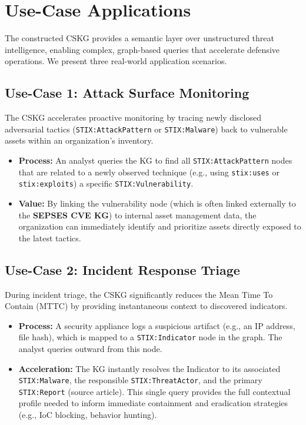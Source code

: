\section{Use-Case Applications}

The constructed CSKG provides a semantic layer over unstructured threat intelligence, enabling complex, graph-based queries that accelerate defensive operations. We present three real-world application scenarios.

\subsection{Use-Case 1: Attack Surface Monitoring}
The CSKG accelerates proactive monitoring by tracing newly disclosed adversarial tactics (\texttt{STIX:AttackPattern} or \texttt{STIX:Malware}) back to vulnerable assets within an organization's inventory.

\begin{itemize}
    \item \textbf{Process:} An analyst queries the KG to find all \texttt{STIX:AttackPattern} nodes that are related to a newly observed technique (e.g., using \texttt{stix:uses} or \texttt{stix:exploits}) a specific \texttt{STIX:Vulnerability}.
    \item \textbf{Value:} By linking the vulnerability node (which is often linked externally to the \textbf{SEPSES CVE KG}) to internal asset management data, the organization can immediately identify and prioritize assets directly exposed to the latest tactics.
\end{itemize}

\subsection{Use-Case 2: Incident Response Triage}
During incident triage, the CSKG significantly reduces the Mean Time To Contain (MTTC) by providing instantaneous context to discovered indicators.

\begin{itemize}
    \item \textbf{Process:} A security appliance logs a suspicious artifact (e.g., an IP address, file hash), which is mapped to a \texttt{STIX:Indicator} node in the graph. The analyst queries outward from this node.
    \item \textbf{Acceleration:} The KG instantly resolves the Indicator to its associated \texttt{STIX:Malware}, the responsible \texttt{STIX:ThreatActor}, and the primary \texttt{STIX:Report} (source article). This single query provides the full contextual profile needed to inform immediate containment and eradication strategies (e.g., IoC blocking, behavior hunting).
\end{itemize}

